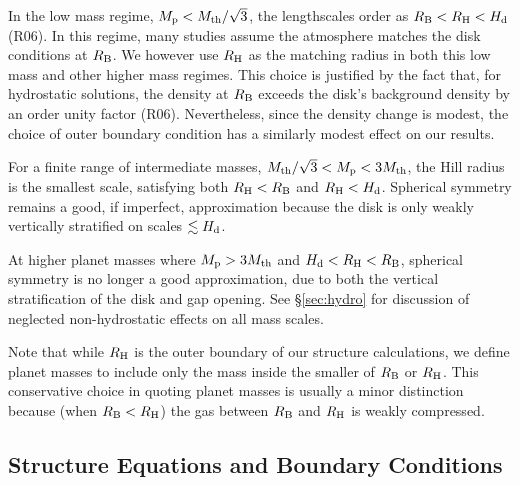 \documentclass[apj, numberedappendix]{emulateapj}
\newcommand{\RB}{R_{\rm B}}
\newcommand{\RH}{R_{\rm H}}
\newcommand{\pla}{_{\rm p}}
\newcommand{\di}{_{\rm d}}
\begin{document}
In the low mass regime, $M\pla < M_{\rm th}/\sqrt{3}$, the lengthscales order as $\RB< \RH<H\di$ (R06).  In this regime, many studies assume the atmosphere matches the disk conditions at $\RB$.  We however use $\RH$ as the matching radius in both this low mass and other higher mass regimes.  This choice is justified by the fact that, for hydrostatic solutions, the  density at $\RB$ exceeds the disk's background density by an order unity factor (R06).  Nevertheless, since the density change is modest, the choice of outer boundary condition has a similarly modest effect on our results. 

For a finite range of intermediate masses, $M_{\rm th}/\sqrt{3} < M\pla < 3 M_{\rm th}$, the Hill radius is the smallest scale, satisfying both $\RH < \RB$ and $\RH < H\di$.  Spherical symmetry remains a good, if imperfect, approximation because the disk is only weakly vertically stratified on  scales $\lesssim H\di$.  

At higher planet masses where $M\pla > 3 M_{\rm th}$ and $H\di < \RH < \RB$, spherical symmetry is no longer a good approximation, due to both the vertical stratification of the disk and gap opening.   See \S\ref{sec:hydro} for discussion of neglected non-hydrostatic effects on all mass scales.

Note that while $\RH$ is the outer boundary of our structure calculations, we define planet masses to include only the mass inside the smaller of $\RB$ or $\RH$.    This conservative choice in quoting planet masses is usually a minor distinction because (when $\RB < \RH$) the gas between $\RB$ and $\RH$ is weakly compressed.


\subsection{Structure Equations and Boundary Conditions}
\label{sec:struct}
\end{document}

